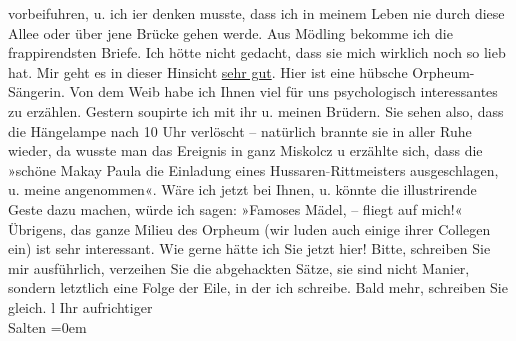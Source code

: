 \begin{ledgroupsized}[t]{13cm}
               vorbeifuhren, u. ich i{\geminationm}er denken musste, dass ich in
               meinem Leben nie durch diese Allee oder über jene Brücke gehen werde. \pend
           \pstart
           {\pb}Aus Mödling bekomme ich die frappirendsten
               Briefe. Ich hötte nicht gedacht, dass sie mich wirklich
               noch so lieb hat. Mir geht es in dieser Hinsicht \uline{sehr
                  gut}.\pend
           \pstart
           Hier ist eine hübsche Orpheum-Sängerin. Von dem Weib habe ich
               Ihnen viel für uns psychologisch interessantes zu erzählen.\pend
           \pstart
           Gestern soupirte ich mit ihr u. meinen Brüdern. Sie sehen also, dass die Hängelampe nach 10 Uhr verlöscht –
               natürlich brannte sie in aller Ruhe wieder, {\pb}da wusste man das Ereignis
               in ganz Miskolcz u erzählte sich, dass die
               »schöne Makay Paula die Einladung eines
                  Hussaren\textcolor{gray}{-}Rittmeisters ausgeschlagen, u. meine angenommen«. \pend
           \pstart
           Wäre ich jetzt bei Ihnen, u. könnte die illustrirende Geste dazu machen, würde ich
               sagen: »Famoses Mädel, – fliegt \label{K_L03103-1v}\label{K_L03103-1h} auf mich!«\pend
           \pstart
           Übrigens, das ganze Milieu des Orpheum (wir luden
               auch einige ihrer Collegen ein) ist sehr interessant.\pend
           \pstart
           Wie gerne hätte ich Sie jetzt hier!\pend
           \pstart
           Bitte, schreiben Sie mir ausführlich, verzeihen Sie die abgehackten Sätze, sie sind
               nicht Manier, sondern letztlich eine Folge der Eile, in der ich schreibe.\pend
           \pstart
           Bald mehr, schreiben Sie gleich. l \pend
           \pstart
           Ihr aufrichtiger{\\[\baselineskip]}\spacefill\mbox{Salten}\pend
           \leftskip=0em{}
         
         \endnumbering{}\end{ledgroupsized}\begin{anhang}\end{anhang}\newcommand{\dateiname}{L03103}\newcommand{\titel}{Felix Salten an Arthur Schnitzler, 2. 9. 1891}\newcommand{\editorInnen}{Martin Anton Müller und Laura Untner}
      